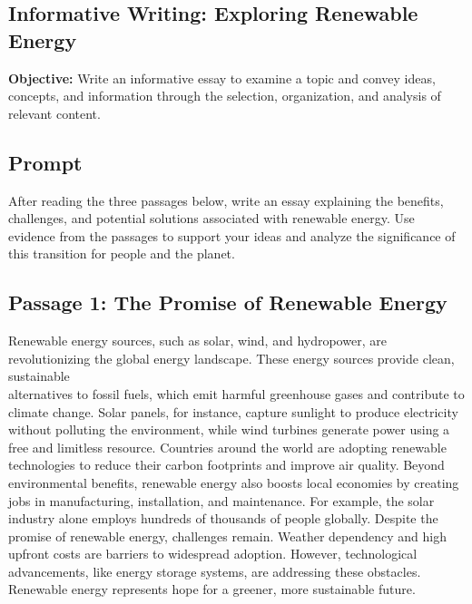 \documentclass[12pt]{article}
\begin{document}
\subsection*{Informative Writing: Exploring Renewable Energy}
\onehalfspacing

\begin{tcolorbox}[colframe=black!40, colback=gray!0, title=Learning Objective]
\textbf{Objective:} Write an informative essay to examine a topic and convey ideas, concepts, and information through the selection, organization, and analysis of relevant content.
\end{tcolorbox}

\subsection*{Prompt}

After reading the three passages below, write an essay explaining the benefits, \\challenges, and potential solutions associated with renewable energy. Use evidence from the passages to support your ideas and analyze the significance of this transition for people and the planet.

\subsection*{Passage 1: The Promise of Renewable Energy}

Renewable energy sources, such as solar, wind, and hydropower, are revolutionizing the global energy landscape. These energy sources provide clean, sustainable \\alternatives to fossil fuels, which emit harmful greenhouse gases and contribute to climate change. Solar panels, for instance, capture sunlight to produce electricity without polluting the environment, while wind turbines generate power using a free and limitless resource. Countries around the world are adopting renewable technologies to reduce their carbon footprints and improve air quality. Beyond\\ environmental benefits, renewable energy also boosts local economies by creating jobs in manufacturing, installation, and maintenance. For example, the solar industry alone employs hundreds of thousands of people globally. Despite the promise of renewable energy, challenges remain. Weather dependency and high upfront costs are barriers to widespread adoption. However, technological advancements, like energy storage systems, are addressing these obstacles. Renewable energy represents hope for a greener, more sustainable future.
\end{document}
